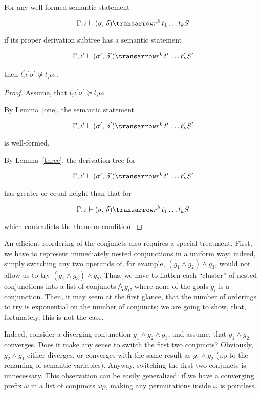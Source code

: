 \begin{theorem}
\normalfont
For any well-formed semantic statement 

$$
\otrans{\Gamma,\iota}{(\sigma,\,\delta)}{r^k\,t_1\dots t_k}{S}
$$ 

if its proper derivation subtree has a semantic statement 

$$
\otrans{\Gamma,\iota^\prime}{(\sigma^\prime,\,\delta^\prime)}{r^k\,t^\prime_1\dots t^\prime_k}{S^\prime}
$$

then \mbox{$\overline{t^\prime_i \iota^\prime \sigma^\prime} \not \succeq \overline{t^{\phantom{\prime}}_i \iota \sigma}$}. 
\end{theorem}
\begin{proof}
Assume, that \mbox{$\overline{t^\prime_i \iota^\prime \sigma^\prime}\succeq \overline{t^{\phantom{\prime}}_i \iota \sigma}$}. 

By Lemma~\ref{one}, the semantic statement

$$
\otrans{\Gamma,\iota^\prime}{(\sigma^\prime,\,\delta^\prime)}{r^k\,t^\prime_1\dots t^\prime_k}{S^\prime}
$$

\noindent is well-formed.

By Lemma~\ref{three}, the derivation tree for

$$
\otrans{\Gamma,\iota^\prime}{(\sigma^\prime,\,\delta^\prime)}{r^k\,t^\prime_1\dots t^\prime_k}{S^\prime}
$$

\noindent has greater or equal height than that for

$$
\otrans{\Gamma,\iota}{(\sigma,\,\delta)}{r^k\,t_1\dots t_k}{S}
$$ 

\noindent which contradicts the theorem condition.
\end{proof}

An efficient reordering of the conjuncts also requires a special treatment. First, we have to represent immediately nested conjunctions in a 
uniform way: indeed, simply switching any two operands of, for example, \mbox{$(g_1\wedge g_2)\wedge g_3$}, would not 
allow us to try \mbox{$(g_1\wedge g_3)\wedge g_2$}. Thus, we have to flatten each ``cluster'' of nested conjunctions into a list of conjuncts\mbox{$\bigwedge g_i$}, 
where none of the goals $g_i$ is a conjunction. Then, it may seem at the first glance, that the number of orderings to try 
is exponential on the number of conjuncts; we are going to show, that, fortunately, this is not the case. 

Indeed, consider a diverging conjunction \mbox{$g_1\wedge g_2\wedge g_3$}, and assume, that \mbox{$g_1\wedge g_2$} converges. 
Does it make any sense to switch the first two conjuncts? Obviously, \mbox{$g_2\wedge g_1$} either diverges, or converges with the same 
result as \mbox{$g_1\wedge g_2$} (up to the renaming of semantic variables). Anyway, switching the first two conjuncts is
unnecessary. This observation can be easily generalized: if we have a converging prefix $\omega$ in a list of conjuncts $\omega\rho$, making
any permutations inside $\omega$ is pointless.

